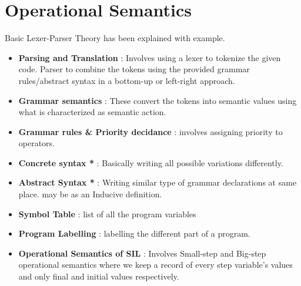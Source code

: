 \chapter{Operational Semantics}

Basic Lexer-Parser Theory has been explained with example.

\begin{itemize}
	\item{\textbf{Parsing and Translation} : Involves using a lexer to tokenize the given code. Parser to combine the tokens using the provided grammar rules/abstract syntax in a bottom-up or left-right approach.
	}

	\item{\textbf{Grammar semantics} : These convert the tokens into semantic values using what is characterized as semantic action.
	}

	\item{\textbf{Grammar rules \& Priority decidance} : involves assigning priority to operators.
	}

	\item{\textbf{Concrete syntax *} : Basically writing all possible variations differently.
	}

	\item{\textbf{Abstract Syntax *} : Writing similar type of grammar declarations at same place. may be as an Inducive definition.
	}

	\item{\textbf{Symbol Table} : list of all the program variables
	}

	\item{\textbf{Program Labelling} : labelling the different part of a program.
	}

	\item{\textbf{Operational Semantics of SIL} : Involves Small-step and Big-step operational semantics where we keep a record of every step variable's values and only final and initial values respectively.
	}

\end{itemize}
